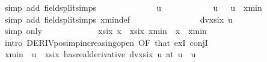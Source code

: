 \begin{isabellebody}
\ {\isacharparenleft}{\kern0pt}simp\ add{\isacharcolon}{\kern0pt}\ field{\isacharunderscore}{\kern0pt}split{\isacharunderscore}{\kern0pt}simps{\isacharparenright}{\kern0pt}\isanewline
\ \ \ \ \ \ \ \ \isamarkupfalse%
\ {\isachardoublequoteopen}{\isasymxi}\ {\isacharless}{\kern0pt}\ {}\ {\isacharslash}{\kern0pt}\ u{\isachardoublequoteclose}\isanewline
\ \ \ \ \ \ \ \ \ \ \isamarkupfalse%
\ {\isacartoucheopen}u\ {\isachargreater}{\kern0pt}\ {}{\isacartoucheclose}\ {\isacartoucheopen}u\ {\isacharless}{\kern0pt}\ xmin{\isacartoucheclose}\ {\isacartoucheopen}{}\ {\isacharless}{\kern0pt}\ {\isasymxi}{\isacartoucheclose}\ \isamarkupfalse%
\ {\isacharparenleft}{\kern0pt}simp\ add{\isacharcolon}{\kern0pt}\ field{\isacharunderscore}{\kern0pt}split{\isacharunderscore}{\kern0pt}simps\ xmin{\isacharunderscore}{\kern0pt}def{\isacharparenright}{\kern0pt}\isanewline
\ \ \ \ \ \ \isamarkupfalse%
\isanewline
\ \ \ \ \ \ \isamarkupfalse%
\ \isamarkupfalse%
\ {\isachardoublequoteopen}dvxsix\ u\ {\isacharless}{\kern0pt}\ {}{\isachardoublequoteclose}\isanewline
\ \ \ \ \ \ \ \ \isamarkupfalse%
\ {\isacharparenleft}{\kern0pt}simp\ only{\isacharcolon}{\kern0pt}{\isacharparenright}{\kern0pt}\isanewline
\ \ \ \ \isakeywordONE{{\isacharbraceright}{\kern0pt}}\isamarkupfalse%
\isanewline
\ \ \isamarkupfalse%
\isanewline
\ \ \isamarkupfalse%
\ \isamarkupfalse%
\ {\isachardoublequoteopen}xsix\ x\ {\isachargreater}{\kern0pt}\ xsix\ xmin{\isachardoublequoteclose}\ \ {\isachardoublequoteopen}x\ {\isachargreater}{\kern0pt}\ xmin{\isachardoublequoteclose}\isanewline
\ \ \isamarkupfalse%
\ {\isacharparenleft}{\kern0pt}intro\ DERIV{\isacharunderscore}{\kern0pt}pos{\isacharunderscore}{\kern0pt}imp{\isacharunderscore}{\kern0pt}increasing{\isacharunderscore}{\kern0pt}open\ {\isacharbrackleft}{\kern0pt}OF\ that{\isacharbrackright}{\kern0pt}\ exI\ conjI{\isacharparenright}{\kern0pt}\isanewline
\ \ \ \ \isamarkupfalse%
\ {\isachardoublequoteopen}{\isasymlbrakk}xmin\ {\isacharless}{\kern0pt}\ u{\isasymrbrakk}\ {\isasymLongrightarrow}\ {\isacharparenleft}{\kern0pt}xsix\ has{\isacharunderscore}{\kern0pt}real{\isacharunderscore}{\kern0pt}derivative\ dvxsix\ u{\isacharparenright}{\kern0pt}\ {\isacharparenleft}{\kern0pt}at\ u{\isacharparenright}{\kern0pt}{\isachardoublequoteclose}\ \ u\isanewline

\end{isabellebody}
